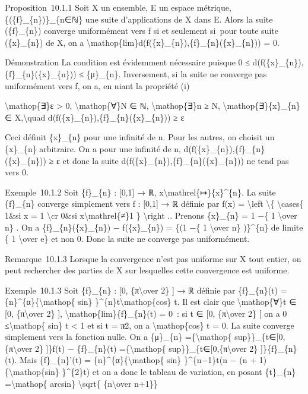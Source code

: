 \documentclass[]{article}
\begin{document}
Proposition~10.1.1 Soit X un ensemble, E un espace métrique,
\{(\{f\}\_\{n\})\}\_\{n∈ℕ\} une suite d'applications de X dans E. Alors
la suite (\{f\}\_\{n\}) converge uniformément vers f si et seulement
si~pour toute suite (\{x\}\_\{n\}) de X, on a
\textbackslash{}mathop\{lim\}d(f(\{x\}\_\{n\}),\{f\}\_\{n\}(\{x\}\_\{n\}))
= 0.

Démonstration La condition est évidemment nécessaire puisque 0 ≤
d(f(\{x\}\_\{n\}),\{f\}\_\{n\}(\{x\}\_\{n\})) ≤ \{μ\}\_\{n\}.
Inversement, si la suite ne converge pas uniformément vers f, on a, en
niant la propriété (i)

\textbackslash{}mathop\{∃\}ε \textgreater{} 0,
\textbackslash{}mathop\{∀\}N ∈ ℕ, \textbackslash{}mathop\{∃\}n ≥ N,
\textbackslash{}mathop\{∃\}\{x\}\_\{n\} ∈ X,\textbackslash{}quad
d(f(\{x\}\_\{n\}),\{f\}\_\{n\}(\{x\}\_\{n\})) ≥ ε

Ceci définit \{x\}\_\{n\} pour une infinité de n. Pour les autres, on
choisit un \{x\}\_\{n\} arbitraire. On a pour une infinité de n,
d(f(\{x\}\_\{n\}),\{f\}\_\{n\}(\{x\}\_\{n\})) ≥ ε et donc la suite
d(f(\{x\}\_\{n\}),\{f\}\_\{n\}(\{x\}\_\{n\})) ne tend pas vers 0.

Exemple~10.1.2 Soit \{f\}\_\{n\} : {[}0,1{]} → ℝ,
x\textbackslash{}mathrel\{↦\}\{x\}\^{}\{n\}. La suite \{f\}\_\{n\}
converge simplement vers f : {[}0,1{]} → ℝ définie par f(x) =
\textbackslash{}left \textbackslash{}\{ \textbackslash{}cases\{ 1\&si x
= 1 \textbackslash{}cr 0\&si x\textbackslash{}mathrel\{≠\}1 \}
\textbackslash{}right .. Prenons \{x\}\_\{n\} = 1 −\{ 1
\textbackslash{}over n\} . On a \{f\}\_\{n\}(\{x\}\_\{n\}) −
f(\{x\}\_\{n\}) = \{(1 −\{ 1 \textbackslash{}over n\} )\}\^{}\{n\} de
limite \{ 1 \textbackslash{}over e\} et non 0. Donc la suite ne converge
pas uniformément.

Remarque~10.1.3 Lorsque la convergence n'est pas uniforme sur X tout
entier, on peut rechercher des parties de X sur lesquelles cette
convergence est uniforme.

Exemple~10.1.3 Soit \{f\}\_\{n\} : {[}0, \{π\textbackslash{}over 2\} {]}
→ ℝ définie par \{f\}\_\{n\}(t) =
\{n\}\^{}\{α\}\{\textbackslash{}mathop\{ sin\}
\}\^{}\{n\}t\textbackslash{}mathop\{cos\} t. Il est clair que
\textbackslash{}mathop\{∀\}t ∈ {[}0, \{π\textbackslash{}over 2\} {]},
\textbackslash{}mathop\{lim\}\{f\}\_\{n\}(t) = 0~: si t ∈ {[}0,
\{π\textbackslash{}over 2\} {[} on a 0 ≤\textbackslash{}mathop\{ sin\} t
\textless{} 1 et si t = π∕2, on a \textbackslash{}mathop\{cos\} t = 0.
La suite converge simplement vers la fonction nulle. On a \{μ\}\_\{n\}
=\{\textbackslash{}mathop\{ sup\}\}\_\{t∈{[}0,\{π\textbackslash{}over
2\} {]}\}\textbar{}f(t) − \{f\}\_\{n\}(t)\textbar{}
=\{\textbackslash{}mathop\{ sup\}\}\_\{t∈{[}0,\{π\textbackslash{}over
2\} {]}\}\{f\}\_\{n\}(t). Mais \{f\}\_\{n\}'(t) =
\{n\}\^{}\{α\}\{\textbackslash{}mathop\{ sin\} \}\^{}\{n−1\}t(n − (n +
1)\{\textbackslash{}mathop\{sin\} \}\^{}\{2\}t) et on a donc le tableau
de variation, en posant \{t\}\_\{n\} =\textbackslash{}mathop\{ arcsin\}
\textbackslash{}sqrt\{ \{n\textbackslash{}over n+1\}\}
\end{document}
